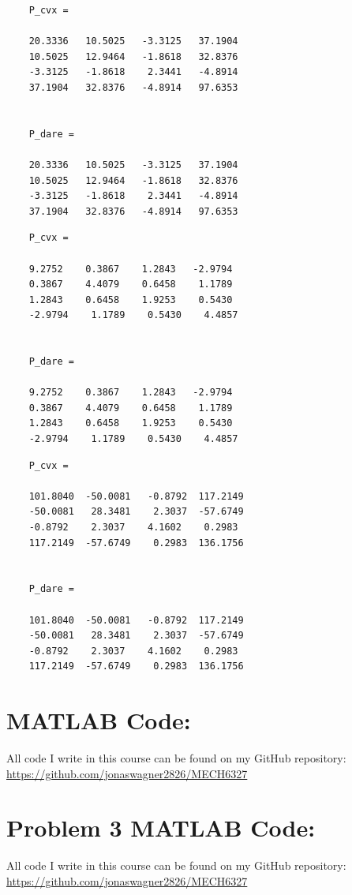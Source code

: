 \documentclass[letter]{article}
\begin{document}
\begin{Verbatim}
	P_cvx =
	
	20.3336   10.5025   -3.3125   37.1904
	10.5025   12.9464   -1.8618   32.8376
	-3.3125   -1.8618    2.3441   -4.8914
	37.1904   32.8376   -4.8914   97.6353
	
	
	P_dare =
	
	20.3336   10.5025   -3.3125   37.1904
	10.5025   12.9464   -1.8618   32.8376
	-3.3125   -1.8618    2.3441   -4.8914
	37.1904   32.8376   -4.8914   97.6353
\end{Verbatim}
\begin{Verbatim}
	P_cvx =
	
	9.2752    0.3867    1.2843   -2.9794
	0.3867    4.4079    0.6458    1.1789
	1.2843    0.6458    1.9253    0.5430
	-2.9794    1.1789    0.5430    4.4857
	
	
	P_dare =
	
	9.2752    0.3867    1.2843   -2.9794
	0.3867    4.4079    0.6458    1.1789
	1.2843    0.6458    1.9253    0.5430
	-2.9794    1.1789    0.5430    4.4857
\end{Verbatim}
\begin{Verbatim}
	P_cvx =
	
	101.8040  -50.0081   -0.8792  117.2149
	-50.0081   28.3481    2.3037  -57.6749
	-0.8792    2.3037    4.1602    0.2983
	117.2149  -57.6749    0.2983  136.1756
	
	
	P_dare =
	
	101.8040  -50.0081   -0.8792  117.2149
	-50.0081   28.3481    2.3037  -57.6749
	-0.8792    2.3037    4.1602    0.2983
	117.2149  -57.6749    0.2983  136.1756
\end{Verbatim}

\newpage
\appendix
\section{MATLAB Code:}\label{apx:matlab}
All code I write in this course can be found on my GitHub repository:\\
\href{https://github.com/jonaswagner2826/MECH6337}{https://github.com/jonaswagner2826/MECH6327}


\newpage
\section{Problem 3 MATLAB Code:}\label{apx:pblm1_matlab}
All code I write in this course can be found on my GitHub repository:\\
\href{https://github.com/jonaswagner2826/MECH6327}{https://github.com/jonaswagner2826/MECH6327}

\end{document}
